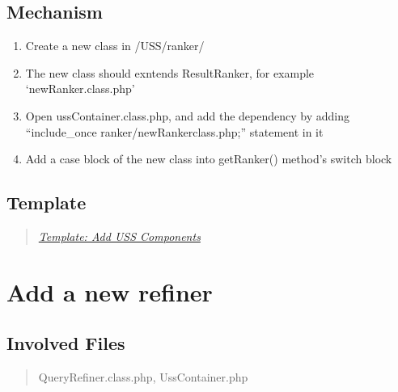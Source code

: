 \documentclass[letterpaper,10pt,english]{sphinxmanual}
\begin{document}
\subsection{Mechanism}
\label{docs/hooks/new_ranker:mechanism}\begin{enumerate}
\item {} 
Create a new class in /USS/ranker/

\item {} 
The new class should exntends ResultRanker, for example `newRanker.class.php'

\item {} 
Open ussContainer.class.php, and add the dependency by adding ``include\_once ranker/newRankerclass.php;'' statement in it

\item {} 
Add a case block of the new class into getRanker() method's switch block

\end{enumerate}


\subsection{Template}
\label{docs/hooks/new_ranker:template}\begin{quote}

{\hyperref[docs/hooks/t_uss_components:hook-template-uss]{\emph{Template: Add USS Components}}}
\end{quote}


\section{Add a new refiner}
\label{docs/hooks/new_refiner:add-a-new-refiner}\label{docs/hooks/new_refiner::doc}\label{docs/hooks/new_refiner:hook-refiner}

\subsection{Involved Files}
\label{docs/hooks/new_refiner:involved-files}\begin{quote}

QueryRefiner.class.php, UssContainer.php
\end{quote}
\end{document}
